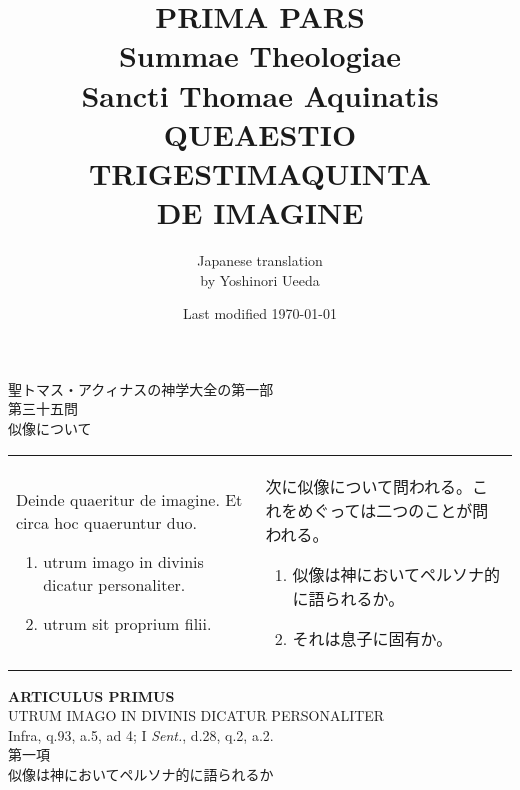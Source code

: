 \documentclass[10pt]{jsarticle} %
\title{{\bf PRIMA PARS}\\{\HUGE Summae Theologiae}\\Sancti Thomae
Aquinatis\\{\sffamily QUEAESTIO TRIGESTIMAQUINTA}\\DE IMAGINE}
\author{Japanese translation\\by Yoshinori {\sc Ueeda}}
\date{Last modified \today}
\begin{document}
\maketitle
\thispagestyle{empty}
\begin{center}
{\Large 聖トマス・アクィナスの神学大全の第一部\\第三十五問\\似像について}
\end{center}



\begin{longtable}{p{21em}p{21em}}
{\Huge D}einde quaeritur de imagine. Et circa hoc quaeruntur
 duo. 
 

\begin{enumerate}
 \item utrum imago in divinis dicatur personaliter. 
 \item utrum sit proprium filii.
\end{enumerate}

&

次に似像について問われる。これをめぐっては二つのことが問われる。

\begin{enumerate}
 \item 似像は神においてペルソナ的に語られるか。
 \item それは息子に固有か。
\end{enumerate}

\end{longtable}

\newpage


\begin{center}
{\Large {\bf ARTICULUS PRIMUS}}\\
{\large UTRUM IMAGO IN DIVINIS DICATUR PERSONALITER}\\
{\footnotesize Infra, q.93, a.5, ad 4; I {\itshape Sent.}, d.28, q.2,
 a.2.}\\
{\Large 第一項\\似像は神においてペルソナ的に語られるか}
\end{center}
\end{document}
